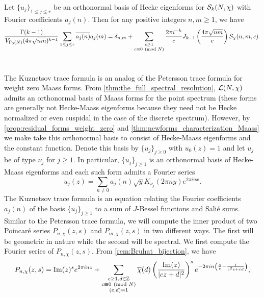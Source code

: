     \begin{theorem}
      Let $\{u_{j}\}_{1 \le j \le r}$ be an orthonormal basis of Hecke eigenforms for $\mathcal{S}_{k}(N,\chi)$ with Fourier coefficients $a_{j}(n)$. Then for any positive integers $n,m \ge 1$, we have
      \[
        \frac{\Gamma(k-1)}{V_{\Gamma_{0}(N)}(4\pi\sqrt{nm})^{k-1}}\sum_{1 \le j \le r}\overline{a_{j}(n)}a_{j}(m) = \delta_{n,m}+\sum_{\substack{c \ge 1 \\ c \equiv 0 \ \left(\text{mod }N\right)}}\frac{2\pi i^{-k}}{c}J_{k-1}\left(\frac{4\pi\sqrt{nm}}{c}\right)S_{\chi}(n,m,c).
      \]
    \end{theorem}
  \section{}
    The Kuznetsov trace formula is an analog of the Petersson trace formula for weight zero Maass forms. From \cref{thm:the_full_spectral_resolution}, $\mathcal{L}(N,\chi)$ admits an orthonormal basis of Maass forms for the point spectrum (these forms are generally not Hecke-Maass eigenforms because they need not be Hecke normalized or even cuspidal in the case of the discrete spectrum). However, by \cref{prop:residual_forms_weight_zero} and \cref{thm:newforms_characterization_Maass} we make take this orthonormal basis to consist of Hecke-Maass eigenforms and the constant function. Denote this basis by $\{u_{j}\}_{j \ge 0}$ with $u_{0}(z) = 1$ and let $u_{j}$ be of type $\nu_{j}$ for $j \ge 1$. In particular, $\{u_{j}\}_{j \ge 1}$ is an orthonormal basis of Hecke-Maass eigenforms and each such form admits a Fourier series
    \[
      u_{j}(z) = \sum_{n \neq 0}a_{j}(n)\sqrt{y}K_{\nu_{j}}(2\pi ny)e^{2\pi inx}.
    \]
    The Kuznetsov trace formula is an equation relating the Fourier coefficients $a_{j}(n)$ of the basis $\{u_{j}\}_{j \ge 1}$ to a sum of $J$-Bessel functions and Sali\'e sums. Similar to the Petersson trace formula, we will compute the inner product of two Poincar\'e series $P_{n,\chi}(z,s)$ and $P_{m,\chi}(z,s)$ in two different ways. The first will be geometric in nature while the second will be spectral. We first compute the Fourier series of $P_{n,\chi}(z,s)$. From \cref{rem:Bruhat_bijection}, we have
    \[
      P_{n,\chi}(z,s) = \mathrm{Im}(z)^{s}e^{2\pi inz}+\sum_{\substack{c \ge 1, d \in \mathbb{Z} \\ c \equiv 0 \ \left(\text{mod }N\right) \\ (c,d) = 1}}\overline{\chi}(d)\left(\frac{\mathrm{Im}(z)}{|cz+d|^{2}}\right)^{s}e^{-2\pi in\left(\frac{a}{c}-\frac{1}{c^{2}z+cd}\right)},
    \]
